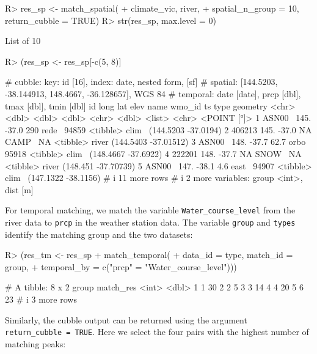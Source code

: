 \documentclass[
]{jss}
\begin{document}
\begin{CodeChunk}
\begin{CodeInput}
R> res_sp <- match_spatial(
+   climate_vic, river, 
+   spatial_n_group = 10, return_cubble = TRUE)
R> str(res_sp, max.level = 0)
\end{CodeInput}
\begin{CodeOutput}
List of 10
\end{CodeOutput}
\begin{CodeInput}
R> (res_sp <- res_sp[-c(5, 8)] %
\end{CodeInput}
\begin{CodeOutput}
# cubble:   key: id [16], index: date, nested form, [sf]
# spatial:  [144.5203, -38.144913, 148.4667, -36.128657], WGS 84
# temporal: date [date], prcp [dbl], tmax [dbl], tmin [dbl]
  id      long   lat  elev name  wmo_id ts       type              geometry
  <chr>  <dbl> <dbl> <dbl> <chr>  <dbl> <list>   <chr>          <POINT [°]>
1 ASN00~  145. -37.0 290   rede~  94859 <tibble> clim~  (144.5203 -37.0194)
2 406213  145. -37.0  NA   CAMP~     NA <tibble> river (144.5403 -37.01512)
3 ASN00~  148. -37.7  62.7 orbo~  95918 <tibble> clim~  (148.4667 -37.6922)
4 222201  148. -37.7  NA   SNOW~     NA <tibble> river  (148.451 -37.70739)
5 ASN00~  147. -38.1   4.6 east~  94907 <tibble> clim~  (147.1322 -38.1156)
# i 11 more rows
# i 2 more variables: group <int>, dist [m]
\end{CodeOutput}
\end{CodeChunk}

For temporal matching, we match the variable
\texttt{Water\_course\_level} from the river data to \texttt{prcp} in
the weather station data. The variable \texttt{group} and \texttt{types}
identify the matching group and the two datasets:

\begin{CodeChunk}
\begin{CodeInput}
R> (res_tm <- res_sp %
+   match_temporal(
+     data_id = type, match_id = group,
+     temporal_by = c("prcp" = "Water_course_level")))
\end{CodeInput}
\begin{CodeOutput}
# A tibble: 8 x 2
  group match_res
  <int>     <dbl>
1     1        30
2     2         5
3     3        14
4     4        20
5     6        23
# i 3 more rows
\end{CodeOutput}
\end{CodeChunk}

Similarly, the cubble output can be returned using the argument
\texttt{return\_cubble\ =\ TRUE}. Here we select the four pairs with the
highest number of matching peaks:
\end{document}
